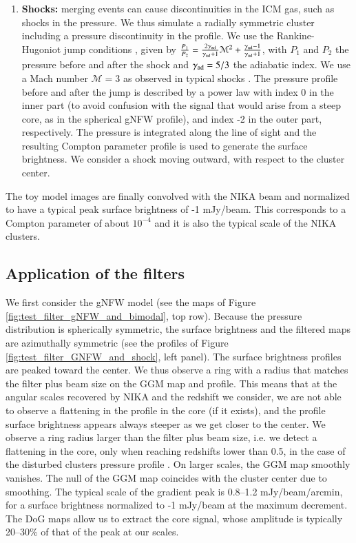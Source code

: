 \documentclass[twocolumn,traditabstract]{aa}
\begin{document}
\begin{enumerate}
\item {\bf Shocks:} merging events can cause discontinuities in the ICM gas, such as shocks in the pressure. We thus simulate a radially symmetric cluster including a pressure discontinuity in the profile. We use the Rankine-Hugoniot jump conditions \citep[see e.g.][for a review]{Sarazin2002}, given by $\frac{P_1}{P_2} = \frac{2 \gamma_{\rm ad}}{\gamma_{\rm ad}+1} \mathcal{M}^2 + \frac{\gamma_{\rm ad}-1}{\gamma_{\rm ad}+1}$, with $P_1$ and $P_2$ the pressure before and after the shock and $\gamma_{\rm ad} = 5/3$ the adiabatic index. We use a Mach number $\mathcal{M} = 3$ as observed in typical shocks \citep[e.g.][]{Markevitch2007}. The pressure profile before and after the jump is described by a power law with index 0 in the inner part (to avoid confusion with the signal that would arise from a steep core, as in the spherical gNFW profile), and index -2 in the outer part, respectively. The pressure is integrated along the line of sight and the resulting Compton parameter profile is used to generate the surface brightness. We consider a shock moving outward, with respect to the cluster center.
\end{enumerate}
The toy model images are finally convolved with the NIKA beam and normalized to have a typical peak surface brightness of -1 mJy/beam. This corresponds to a Compton parameter of about $10^{-4}$ and it is also the typical scale of the NIKA clusters.

\subsection{Application of the filters}
We first consider the gNFW model (see the maps of Figure \ref{fig:test_filter_gNFW_and_bimodal}, top row). Because the pressure distribution is spherically symmetric, the surface brightness and the filtered maps are azimuthally symmetric (see the profiles of Figure \ref{fig:test_filter_GNFW_and_shock}, left panel). The surface brightness profiles are peaked toward the center. We thus observe a ring with a radius that matches the filter plus beam size on the GGM map and profile. This means that at the angular scales recovered by NIKA and the redshift we consider, we are not able to observe a flattening in the profile in the core (if it exists), and the profile surface brightness appears always steeper as we get closer to the center. We observe a ring radius larger than the filter plus beam size, i.e. we detect a flattening in the core, only when reaching redshifts lower than 0.5, in the case of the disturbed clusters pressure profile \citep[i.e. the flatter that we consider here][]{Arnaud2010}. On larger scales, the GGM map smoothly vanishes. The null of the GGM map coincides with the cluster center due to smoothing. The typical scale of the gradient peak is 0.8--1.2 mJy/beam/arcmin, for a surface brightness normalized to -1 mJy/beam at the maximum decrement. The DoG maps allow us to extract the core signal, whose amplitude is typically 20--30\% of that of the peak at our scales.
\end{document}
